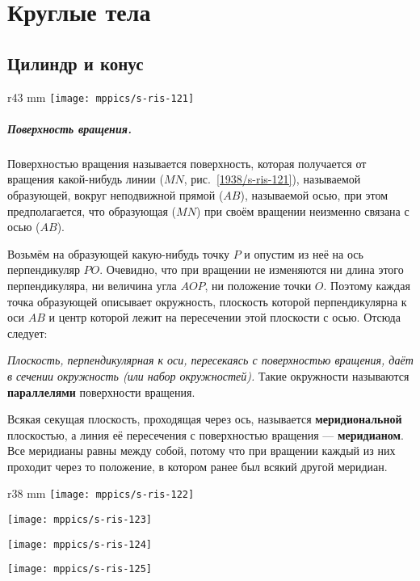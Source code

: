 \chapter{Круглые тела}


\section{Цилиндр и конус}

\begin{wrapfigure}{r}{43 mm}
\vskip-0mm
\centering
\texttt{[image: mppics/s-ris-121]}
\caption{}\label{1938/s-ris-121}
\vskip-0mm
\end{wrapfigure}

\paragraph{Поверхность вращения.}\label{1938/s105}
Поверхностью вращения называется поверхность, которая получается от вращения какой-нибудь линии ($MN$, рис.~\ref{1938/s-ris-121}), называемой образующей, вокруг неподвижной прямой ($AB$), называемой осью, при этом предполагается, что образующая ($MN$) при своём вращении неизменно связана с осью ($AB$).

Возьмём на образующей какую-нибудь точку $P$ и опустим из неё на ось перпендикуляр $PO$.
Очевидно, что при вращении не изменяются ни длина этого перпендикуляра, ни величина угла $AOP$, ни положение точки $O$.
Поэтому каждая точка образующей описывает окружность, плоскость которой перпендикулярна к оси $AB$ и центр которой лежит на пересечении этой плоскости с осью.
Отсюда следует:

\emph{Плоскость, перпендикулярная к оси, пересекаясь с поверхностью вращения, даёт в сечении окружность (или набор окружностей).} 
Такие окружности называются  \textbf{параллелями} поверхности вращения.

Всякая секущая плоскость, проходящая через ось, называется \textbf{меридиональной} плоскостью, а линия её пересечения с поверхностью вращения — \textbf{меридианом}.
Все меридианы равны между собой, потому что при вращении каждый из них проходит через то положение, в котором ранее был всякий другой меридиан.


\begin{wrapfigure}{r}{38 mm}
\vskip-0mm
\centering
\texttt{[image: mppics/s-ris-122]}
\caption{}\label{1938/s-ris-122}
\bigskip
\texttt{[image: mppics/s-ris-123]}
\caption{}\label{1938/s-ris-123}
\bigskip
\texttt{[image: mppics/s-ris-124]}
\caption{}\label{1938/s-ris-124}
\bigskip
\texttt{[image: mppics/s-ris-125]}
\caption{}\label{1938/s-ris-125}
\vskip-0mm
\end{wrapfigure}

